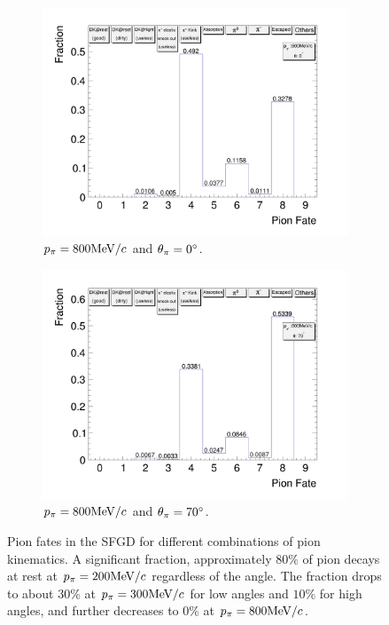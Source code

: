 \begin{figure}[ht]
\begin{subfigure}{\dbfigwid\textwidth}
                    \label{subfig:pi-fate-300-70}
               \end{subfigure}
              \\
               \begin{subfigure}{\dbfigwid\textwidth}
                    \includegraphics[width=\textwidth]{figures/sel/pion_fate_800_0.png}
                    \caption{$p_{\pi}=800\textrm{MeV}/c$ and $\theta_{\pi}=0^\circ$.}
                    \label{subfig:pi-fate-800-0}
               \end{subfigure}
               \begin{subfigure}{\dbfigwid\textwidth}
                    \includegraphics[width=\textwidth]{figures/sel/pion_fate_800_70.png}
                    \caption{$p_{\pi}=800\textrm{MeV}/c$ and $\theta_{\pi}=70^\circ$.}
                    \label{subfig:pi-fate-800-70}
               \end{subfigure}
               \caption{Pion fates in the SFGD for different combinations of pion kinematics. A significant fraction, approximately $80\%$ of pion decays at rest at $p_{\pi}=200\textrm{MeV}/c$ regardless of the angle. The fraction drops to about $30\%$ at $p_{\pi}=300\textrm{MeV}/c$ for low angles and $10\%$ for high angles, and further decreases to $0\%$ at $p_{\pi}=800\textrm{MeV}/c$.}
               \label{fig:pi-fate}
            \end{figure}
       
